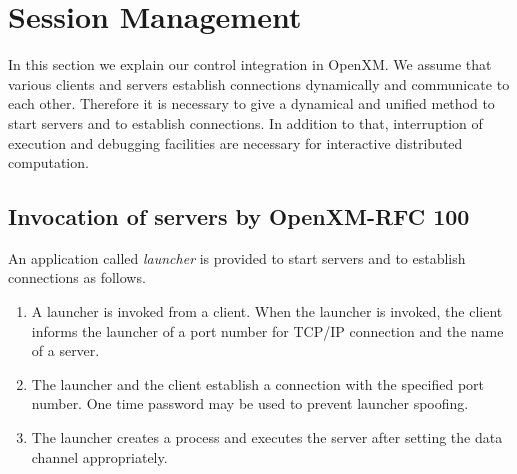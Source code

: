 
\section{Session Management}
\label{secsession}
 
In this section we explain our control integration in
OpenXM.  We assume that various clients and servers
establish connections dynamically and communicate to each
other. Therefore it is necessary to give a dynamical and unified
method to start servers and to establish connections.
In addition to that, interruption of execution and 
debugging facilities
are necessary for interactive distributed computation.

%

\subsection{Invocation of servers by OpenXM-RFC 100}
\label{launcher}

An application called {\it launcher} is provided to start servers
and to establish connections as follows.

\begin{enumerate}
\item A launcher is invoked from a client.
When the launcher is invoked, the client 
informs the launcher of a port number for TCP/IP connection
and the name of a server.
\item The launcher and the client establish a connection with the
specified port number. One time password may be used to prevent
launcher spoofing.
\item The launcher creates a process and executes the server after
setting the data channel appropriately.
\end{enumerate}

